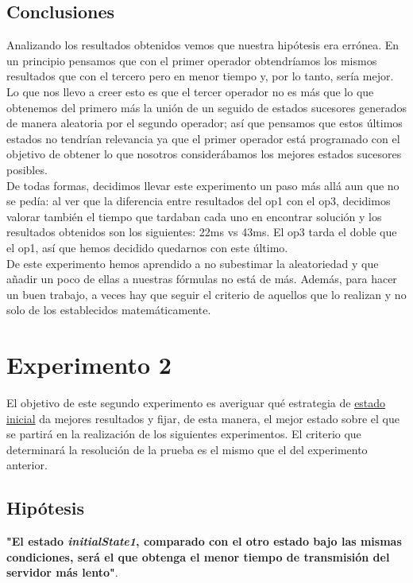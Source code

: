 \documentclass[a4paper,10pt]{report}
\begin{document}
	\subsection*{Conclusiones}
	Analizando los resultados obtenidos vemos que nuestra hipótesis era errónea. En un principio pensamos que con el primer operador obtendríamos los mismos resultados que con el tercero pero en menor tiempo y, por lo tanto, sería mejor.\\
	Lo que nos llevo a creer esto es que el tercer operador no es más que lo que obtenemos del primero más la unión de un seguido de estados sucesores generados de manera aleatoria por el segundo operador; así que pensamos que estos últimos estados no tendrían relevancia ya que el primer operador está programado con el objetivo de obtener lo que nosotros considerábamos los mejores estados sucesores posibles.\\
	De todas formas, decidimos llevar este experimento un paso más allá aun que no se pedía: al ver que la diferencia entre resultados del op1 con el op3, decidimos valorar también el tiempo que tardaban cada uno en encontrar solución y los resultados obtenidos son los siguientes: 22ms vs 43ms. El op3 tarda el doble que el op1, así que hemos decidido quedarnos con este último.\\
	De este experimento hemos aprendido a no subestimar la aleatoriedad y que añadir un poco de ellas a nuestras fórmulas no está de más. Además, para hacer un buen trabajo, a veces hay que seguir el criterio de aquellos que lo realizan y no solo de los establecidos matemáticamente.
	
	
	
	\newpage
	\section*{Experimento 2}

		El objetivo de este segundo experimento es averiguar qué estrategia de \uline{estado inicial} da mejores resultados y fijar, de esta manera, el mejor estado sobre el que se partirá en la realización de los siguientes experimentos. El criterio que determinará la resolución de la prueba es el mismo que el del experimento anterior.
		
	    \subsection*{Hipótesis}
		\textbf{"El estado \textit{initialState1}, comparado con el otro estado bajo las mismas condiciones, será el que obtenga el menor tiempo de transmisión del servidor más lento"}.
	
\end{document}
